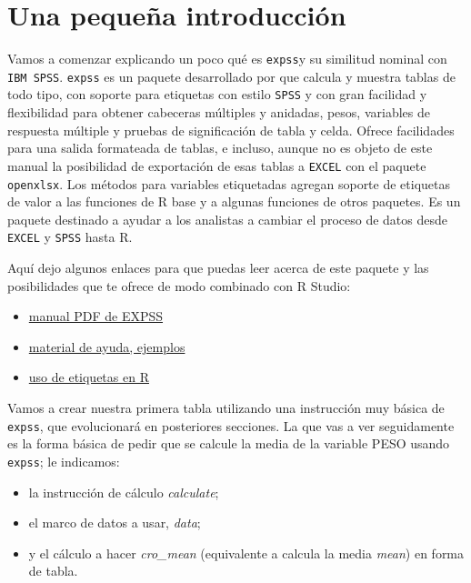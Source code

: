 \documentclass[
]{book}
\providecommand{\tightlist}{%
  \setlength{\itemsep}{0pt}\setlength{\parskip}{0pt}}
\begin{document}
\hypertarget{una-pequeuxf1a-introducciuxf3n}{%
\section{Una pequeña introducción}\label{una-pequeuxf1a-introducciuxf3n}}

Vamos a comenzar explicando un poco qué es \texttt{expss}y su similitud nominal con \texttt{IBM\ SPSS}. \texttt{expss} es un paquete desarrollado por \citet{expss} que calcula y muestra tablas de todo tipo, con soporte para etiquetas con estilo \texttt{SPSS} y con gran facilidad y flexibilidad para obtener cabeceras múltiples y anidadas, pesos, variables de respuesta múltiple y pruebas de significación de tabla y celda. Ofrece facilidades para una salida formateada de tablas, e incluso, aunque no es objeto de este manual la posibilidad de exportación de esas tablas a \texttt{EXCEL} con el paquete \texttt{openxlsx}. Los métodos para variables etiquetadas agregan soporte de etiquetas de valor a las funciones de R base y a algunas funciones de otros paquetes. Es un paquete destinado a ayudar a los analistas a cambiar el proceso de datos desde \texttt{EXCEL} y \texttt{SPSS} hasta R.

Aquí dejo algunos enlaces para que puedas leer acerca de este paquete y las posibilidades que te ofrece de modo combinado con R Studio:

\begin{itemize}
\tightlist
\item
  \href{https://cran.r-project.org/web/packages/expss/expss.pdf}{manual PDF de EXPSS}
\item
  \href{https://cran.r-project.org/web/packages/expss/vignettes/tables-with-labels.html}{material de ayuda, ejemplos}
\item
  \href{https://cran.r-project.org/web/packages/expss/vignettes/labels-support.html}{uso de etiquetas en R}
\end{itemize}

Vamos a crear nuestra primera tabla utilizando una instrucción muy básica de \texttt{expss}, que evolucionará en posteriores secciones. La que vas a ver seguidamente es la forma básica de pedir que se calcule la media de la variable PESO usando \texttt{expss}; le indicamos:

\begin{itemize}
\tightlist
\item
  la instrucción de cálculo \emph{calculate};
\item
  el marco de datos a usar, \emph{data};
\item
  y el cálculo a hacer \emph{cro\_mean} (equivalente a calcula la media \emph{mean}) en forma de tabla.
\end{itemize}
\end{document}

